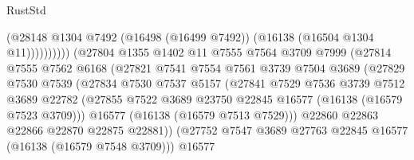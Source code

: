 \begin{lexlean}{RustStd}
\begin{coremodule}
                                        (@28148
                                          @1304
                                          @7492
                                          (@16498 (@16499 @7492))
                                          (@16138 (@16504 @1304 @11))))))))))
                          (@27804
                            @1355
                            @1402
                            @11
                            @7555
                            @7564
                            @3709
                            @7999
                            (@27814
                              @7555
                              @7562
                              @6168
                              (@27821
                                @7541
                                @7554
                                @7561
                                @3739
                                @7504
                                @3689
                                (@27829
                                  @7530
                                  @7539
                                  (@27834
                                    @7530
                                    @7537
                                    @5157
                                    (@27841
                                      @7529
                                      @7536
                                      @3739
                                      @7512
                                      @3689
                                      @22782
                                      (@27855
                                        @7522
                                        @3689
                                        @23750
                                        @22845
                                        @16577
                                        (@16138 (@16579 @7523 @3709)))
                                      @16577
                                      (@16138 (@16579 @7513 @7529)))
                                    @22860
                                    @22863
                                    @22866
                                    @22870
                                    @22875
                                    @22881))
                                (@27752
                                  @7547
                                  @3689
                                  @27763
                                  @22845
                                  @16577
                                  (@16138 (@16579 @7548 @3709)))
                                @16577

\end{coremodule}
\end{lexlean}
